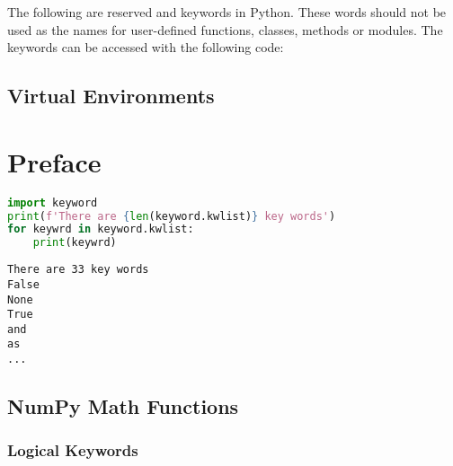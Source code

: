 

        The following are reserved and keywords in Python. These words should
not be used as the names for user-defined functions, classes, methods or
modules. The keywords can be accessed with the following code:



        \section{Virtual Environments}\label{virtual-environments}

                    \chapter{Preface}\label{preface}


        \begin{lstlisting}[language=Python]
import keyword
print(f'There are {len(keyword.kwlist)} key words')
for keywrd in keyword.kwlist:
    print(keywrd)
\end{lstlisting}

\begin{lstlisting}
There are 33 key words
False
None
True
and
as
...
\end{lstlisting}

    \section{NumPy Math Functions}\label{numpy-math-functions}




        \subsection{Logical Keywords}\label{logical-keywords}




